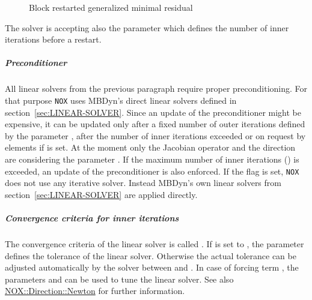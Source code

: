 \begin{description}
\item[] Block restarted generalized minimal residual
\item[] 
\item[]
\item[] 
\item[] 
\item[] 
\item[] 
\item[] 
\item[] 
\item[] 
\item[] 
\item[] 
\item[] 
\end{description}
The  solver is accepting also the parameter  which defines the number of inner iterations before a restart.
\subparagraph{Preconditioner}
All linear solvers from the previous paragraph require proper preconditioning. For that purpose \verb;NOX; uses MBDyn's direct linear solvers defined in section~\ref{sec:LINEAR-SOLVER}. Since an update of the preconditioner might be expensive, it can be updated only after a fixed number of outer iterations defined by the parameter , after the number of inner iterations exceeded  or on request by elements if  is set. At the moment only the  Jacobian operator and the  direction are considering the parameter . If the maximum number of inner iterations () is exceeded, an update of the preconditioner is also enforced. If the flag  is set, \verb;NOX; does not use any iterative solver. Instead MBDyn's own linear solvers from section~\ref{sec:LINEAR-SOLVER} are applied directly.
\subparagraph{Convergence criteria for inner iterations}
The convergence criteria of the linear solver is called . If  is set to , the parameter  defines the tolerance of the linear solver. Otherwise the actual tolerance can be adjusted automatically by the solver between  and . In case of forcing term , the parameters  and  can be used to tune the linear solver. See also \href{https://docs.trilinos.org/latest-release/packages/nox/doc/html/classNOX_1_1Direction_1_1Newton.html}{NOX::Direction::Newton} for further information.
